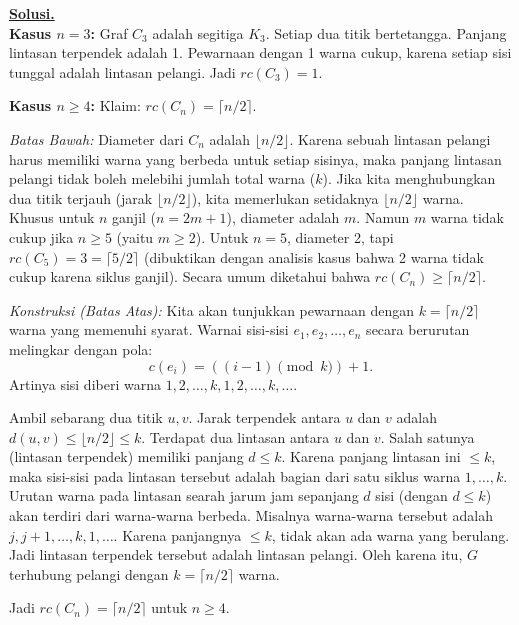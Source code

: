\documentclass[12pt,twoside]{article}
\newenvironment{solution}
{
	\par\noindent\textbf{\underline{Solusi.}}\\
}
{
	\par
}
\begin{document}
\begin{enumerate}
\begin{solution}
          \textbf{Kasus $n=3$:}
          Graf $C_3$ adalah segitiga $K_3$. Setiap dua titik bertetangga. Panjang lintasan terpendek adalah 1.
          Pewarnaan dengan 1 warna cukup, karena setiap sisi tunggal adalah lintasan pelangi. Jadi $rc(C_3)=1$.

          \textbf{Kasus $n \ge 4$:}
          Klaim: $rc(C_n) = \lceil n/2 \rceil$.

          \textit{Batas Bawah:}
          Diameter dari $C_n$ adalah $\lfloor n/2 \rfloor$.
          Karena sebuah lintasan pelangi harus memiliki warna yang berbeda untuk setiap sisinya, maka panjang lintasan pelangi tidak boleh melebihi jumlah total warna ($k$).
          Jika kita menghubungkan dua titik terjauh (jarak $\lfloor n/2 \rfloor$), kita memerlukan setidaknya $\lfloor n/2 \rfloor$ warna.
          Khusus untuk $n$ ganjil ($n=2m+1$), diameter adalah $m$. Namun $m$ warna tidak cukup jika $n \ge 5$ (yaitu $m \ge 2$).
          Untuk $n=5$, diameter 2, tapi $rc(C_5)=3 = \lceil 5/2 \rceil$ (dibuktikan dengan analisis kasus bahwa 2 warna tidak cukup karena siklus ganjil).
          Secara umum diketahui bahwa $rc(C_n) \ge \lceil n/2 \rceil$.

          \textit{Konstruksi (Batas Atas):}
          Kita akan tunjukkan pewarnaan dengan $k = \lceil n/2 \rceil$ warna yang memenuhi syarat.
          Warnai sisi-sisi $e_1, e_2, \dots, e_n$ secara berurutan melingkar dengan pola:
          \[ c(e_i) = ((i-1) \pmod k) + 1. \]
          Artinya sisi diberi warna $1, 2, \dots, k, 1, 2, \dots, k, \dots$.

          Ambil sebarang dua titik $u, v$. Jarak terpendek antara $u$ dan $v$ adalah $d(u,v) \le \lfloor n/2 \rfloor \le k$.
          Terdapat dua lintasan antara $u$ dan $v$. Salah satunya (lintasan terpendek) memiliki panjang $d \le k$.
          Karena panjang lintasan ini $\le k$, maka sisi-sisi pada lintasan tersebut adalah bagian dari satu siklus warna $1, \dots, k$.
          Urutan warna pada lintasan searah jarum jam sepanjang $d$ sisi (dengan $d \le k$) akan terdiri dari warna-warna berbeda.
          Misalnya warna-warna tersebut adalah $j, j+1, \dots, k, 1, \dots$. Karena panjangnya $\le k$, tidak akan ada warna yang berulang.
          Jadi lintasan terpendek tersebut adalah lintasan pelangi.
          Oleh karena itu, $G$ terhubung pelangi dengan $k = \lceil n/2 \rceil$ warna.

          Jadi $rc(C_n) = \lceil n/2 \rceil$ untuk $n \ge 4$.
        \end{solution}
\end{enumerate}
\pagebreak
{}
\end{document}
